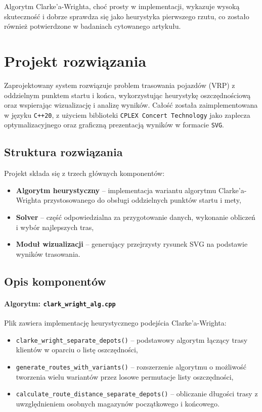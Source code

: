 \documentclass{article}
\begin{document}
Algorytm Clarke’a-Wrighta, choć prosty w implementacji, wykazuje wysoką skuteczność i dobrze sprawdza się jako heurystyka pierwszego rzutu, co zostało również potwierdzone w badaniach cytowanego artykułu.

\section{Projekt rozwiązania}

Zaprojektowany system rozwiązuje problem trasowania pojazdów (VRP) z oddzielnym punktem startu i końca, wykorzystując heurystykę oszczędnościową oraz wspierając wizualizację i analizę wyników. Całość została zaimplementowana w języku \texttt{C++20}, z użyciem biblioteki \texttt{CPLEX Concert Technology} jako zaplecza optymalizacyjnego oraz graficzną prezentacją wyników w formacie \texttt{SVG}.

\subsection*{Struktura rozwiązania}

Projekt składa się z trzech głównych komponentów:
\begin{itemize}
    \item \textbf{Algorytm heurystyczny} -- implementacja wariantu algorytmu Clarke’a-Wrighta przystosowanego do obsługi oddzielnych punktów startu i mety,
    \item \textbf{Solver} -- część odpowiedzialna za przygotowanie danych, wykonanie obliczeń i wybór najlepszych tras,
    \item \textbf{Moduł wizualizacji} -- generujący przejrzysty rysunek SVG na podstawie wyników trasowania.
\end{itemize}

\subsection*{Opis komponentów}

\paragraph{Algorytm: \texttt{clark\_wright\_alg.cpp}}

Plik zawiera implementację heurystycznego podejścia Clarke’a-Wrighta:
\begin{itemize}
    \item \texttt{clarke\_wright\_separate\_depots()} -- podstawowy algorytm łączący trasy klientów w oparciu o listę oszczędności,
    \item \texttt{generate\_routes\_with\_variants()} -- rozszerzenie algorytmu o możliwość tworzenia wielu wariantów przez losowe permutacje listy oszczędności,
    \item \texttt{calculate\_route\_distance\_separate\_depots()} -- obliczanie długości trasy z uwzględnieniem osobnych magazynów początkowego i końcowego.
\end{itemize}
\end{document}

